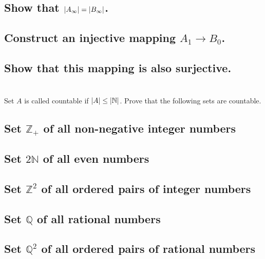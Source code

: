 \documentclass[]{article}
\newcommand{\N}{\mathbb{N}}
\newcommand{\Z}{\mathbb{Z}}
\newcommand{\Q}{\mathbb{Q}}
\begin{document}
\subsection{Show that $\abs{A_\infty}=\abs{B_\infty}$.}






\subsection{Construct an injective mapping $A_1 \rightarrow B_0$.}






\subsection{Show that this mapping is also surjective.}





\newpage
\section{}
Set $A$ is called countable if $\abs{A}\leq \abs{\N}$.
Prove that the following sets are countable.

\subsection{Set $\Z_+$ of all non-negative integer numbers}



\subsection{Set $2\N$ of all even numbers}



\subsection{Set $\Z^2$ of all ordered pairs of integer numbers}



\subsection{Set $\Q$ of all rational numbers}



\subsection{Set $\Q^2$ of all ordered pairs of rational numbers}
\end{document}
